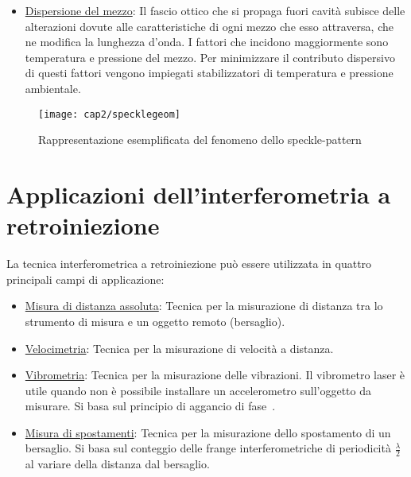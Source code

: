 \begin{itemize}
			 Nelle misure basate sulla tecnica di interferometria a retroiniezione, lo \textit{speckle-pattern} rappresenta il fattore limitante più grande. A causa di tale disturbo, il segnale interferometrico risulterà interrotto ogni qual volta che il fascio di luce incontrerà uno \textit{speckle}. \'E possibile limitare questa problematica aumentando la potenza ottica retro-iniettata o adottando il sistema ottico più adatto per l'applicazione in questione.
	\item \underline{Dispersione del mezzo}: Il fascio ottico che si propaga fuori cavità subisce delle alterazioni dovute alle caratteristiche di ogni mezzo che esso attraversa, che ne modifica la lunghezza d'onda. I fattori che incidono maggiormente sono temperatura e pressione del mezzo. Per minimizzare il contributo dispersivo di questi fattori vengono impiegati stabilizzatori di temperatura e pressione ambientale.
\end{itemize}

\begin{figure}  
  \begin{center}
    \texttt{[image: cap2/specklegeom]}
    \caption{Rappresentazione esemplificata del fenomeno dello speckle-pattern}
    \label{specklegeom}
  \end{center}
\end{figure}

\section{Applicazioni dell'interferometria a retroiniezione}
La tecnica interferometrica a retroiniezione può essere utilizzata in quattro principali campi di applicazione:
\begin{itemize}
	\item \underline{Misura di distanza assoluta}: Tecnica per la misurazione di distanza tra lo strumento di misura e un oggetto remoto (bersaglio).
	\item \underline{Velocimetria}: Tecnica per la misurazione di velocità a distanza.
	\item \underline{Vibrometria}: Tecnica per la misurazione delle vibrazioni. Il vibrometro laser è utile quando non è possibile installare un accelerometro sull'oggetto da misurare. Si basa sul principio di aggancio di fase~\cite{thesismelch}.
	\item \underline{Misura di spostamenti}: Tecnica per la misurazione dello spostamento di un bersaglio. Si basa sul conteggio delle frange interferometriche di periodicità $\frac{\lambda}{2}$ al variare della distanza dal bersaglio.
\end{itemize}

